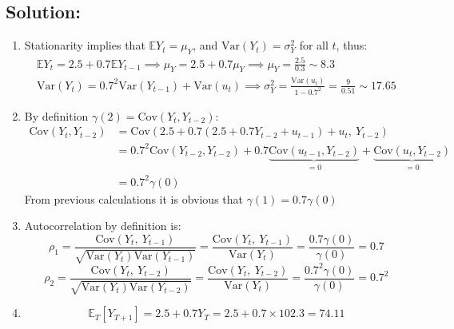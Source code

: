 \documentclass[10pt,a4paper]{amsart}
\newcommand{\E}{\mathbb{E}}
\newcommand{\V}{\text{Var}}
\newcommand{\C}{\text{Cov}}
\begin{document}
\subsection*{Solution:}
\begin{enumerate}
    \item Stationarity implies that $ \E Y_t = \mu_Y $, and $ \V (Y_t) = \sigma_Y^{2} $ for all $ t $, thus:
          \begin{gather*}
              \E Y_t =  2.5 + 0.7 \E Y_{t-1} \implies \mu_Y = 2.5 + 0.7 \mu_Y \implies \mu_Y = \frac{2.5}{0.3} \sim 8.3
              \\
              \V \left( Y_t \right) = 0.7^{2} \V (Y_{t-1}) + \V (u_t) \implies \sigma^{2}_Y = \frac{\V(u_t)}{1 - 0.7^{2}} = \frac{9}{0.51} \sim 17.65
          \end{gather*}
    \item By definition $ \gamma(2) = \C (Y_t, Y_{t-2}) $:
          \begin{align*}
              \C (Y_t, Y_{t-2}) & = \C (2.5 + 0.7(2.5 + 0.7 Y_{t−2} + u_{t-1}) +u_t,~ Y_{t-2})                                                          \\
                                & = 0.7^{2}\C ( Y_{t-2}, Y_{t-2} ) + 0.7 \underbrace{\C ( u_{t-1}, Y_{t-2})}_{=0} + \underbrace{\C (u_t, Y_{t-2})}_{=0} \\
                                & = 0.7^{2} \gamma(0)
          \end{align*}
          From previous calculations it is obvious that $ \gamma(1) = 0.7 \gamma(0) $
    \item Autocorrelation by definition is:
          \[
              \rho_1 = \frac{\C (Y_t,~ Y_{t-1})}{\sqrt{\V(Y_t) \V (Y_{t-1})}} = \frac{\C (Y_t, ~ Y_{t-1})}{\V (Y_t)} = \frac{0.7\gamma(0)}{\gamma(0)} = 0.7
          \]
          \[
              \rho_2 = \frac{\C (Y_t,~ Y_{t-2})}{\sqrt{\V(Y_t) \V (Y_{t-2})}} = \frac{\C (Y_t, ~ Y_{t-2})}{\V (Y_t)} = \frac{0.7^{2}\gamma(0)}{\gamma(0)} = 0.7^{2}
          \]
    \item
          \[
              \E_{T} \left[ Y_{T+1} \right] = 2.5 + 0.7 Y_T = 2.5 + 0.7 \times 102.3 = 74.11
          \]
\end{enumerate}
\end{document}
